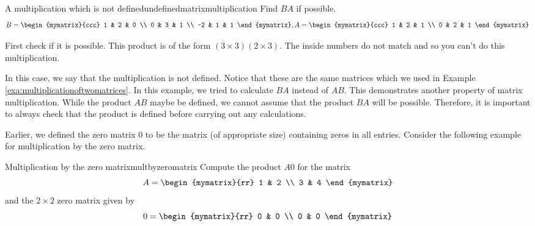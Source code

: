 \begin{example}{A multiplication which is not defined}{undefinedmatrixmultiplication}
Find $BA$ if possible.
\begin{equation*}
B = \begin{mymatrix}{ccc}
1 & 2 & 0 \\
0 & 3 & 1 \\
-2 & 1 & 1
\end{mymatrix},  A = \begin{mymatrix}{ccc}
1 & 2 & 1 \\
0 & 2 & 1
\end{mymatrix}
\end{equation*}
\end{example}

\begin{solution} First check if it is possible. This product is of the form $\left( 3\times 3\right)
\left( 2\times 3\right) .$ The inside numbers do not match and so you can't
do this multiplication. 
\end{solution}

In this case, we say that the multiplication is not defined. 
Notice that these are the same matrices which we used in Example \ref{exa:multiplicationoftwomatrices}.
In this example, we tried to calculate $BA$ instead of $AB$. This demonstrates another property 
of matrix multiplication. While the product $AB$ maybe be defined, we cannot assume that
the product $BA$ will be possible. Therefore, it is important to always check that the product is defined
before carrying out any calculations.

Earlier, we defined the zero matrix $0$ to be the matrix (of
appropriate size) containing zeros in all entries.  Consider the
following example for multiplication by the zero matrix.

\begin{example}{Multiplication by the zero matrix}{multbyzeromatrix}
Compute the product $A0$ for the matrix
\begin{equation*}
A=
\begin{mymatrix}{rr}
1 & 2 \\
3 & 4
\end{mymatrix}
\end{equation*}
and the $2 \times 2$ zero matrix given by
\begin{equation*}
0=
\begin{mymatrix}{rr}
0 & 0 \\
0 & 0
\end{mymatrix}
\end{equation*}
\end{example}

